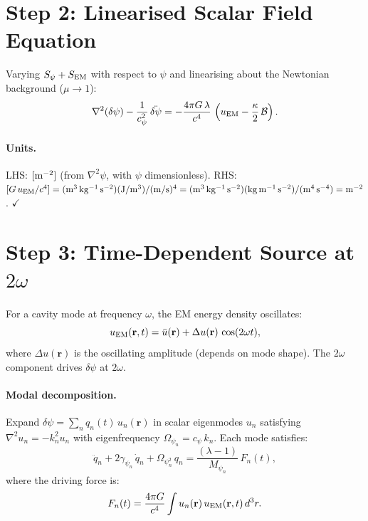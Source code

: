 \documentclass[11pt]{article}
\newcommand{\Opsi}{\Omega_\psi}
\newcommand{\gpsi}{\gamma_\psi}
\newcommand{\Mpsi}{M_\psi}
\newcommand{\calB}{\mathcal{B}}
\theoremstyle{definition}
\theoremstyle{remark}
\begin{document}
\section{Step 2: Linearised Scalar Field Equation}
\label{sec:dim-step2}

Varying $S_\psi + S_{\rm EM}$ with respect to $\psi$ and linearising
about the Newtonian background ($\mu \to 1$):
\begin{equation}
\nabla^2(\delta\psi) - \frac{1}{c_\psi^2}\,\ddot{\delta\psi}
= -\frac{4\pi G\,\lambda}{c^4}\,
\left(u_{\rm EM} - \frac{\kappa}{2}\,\calB\right).
\label{eq:linearised}
\end{equation}

\paragraph{Units.}
LHS: $[{\rm m}^{-2}]$ (from $\nabla^2\psi$, with $\psi$ dimensionless).
RHS: $[G\,u_{\rm EM}/c^4] = ({\rm m^3\,kg^{-1}\,s^{-2}})({\rm J/m^3})
/({\rm m/s})^4 = ({\rm m^3\,kg^{-1}\,s^{-2}})({\rm kg\,m^{-1}\,s^{-2}})
/({\rm m^4\,s^{-4}}) = {\rm m^{-2}}$. $\checkmark$


\section{Step 3: Time-Dependent Source at $2\omega$}
\label{sec:dim-step3}

For a cavity mode at frequency $\omega$, the EM energy density oscillates:
\begin{equation}
u_{\rm EM}(\mathbf{r},t) = \bar{u}(\mathbf{r})
+ \Delta u(\mathbf{r})\,\cos(2\omega t),
\end{equation}
where $\Delta u(\mathbf{r})$ is the oscillating amplitude (depends on
mode shape). The $2\omega$ component drives $\delta\psi$ at $2\omega$.

\paragraph{Modal decomposition.}
Expand $\delta\psi = \sum_n q_n(t)\,u_n(\mathbf{r})$ in scalar
eigenmodes $u_n$ satisfying $\nabla^2 u_n = -k_n^2 u_n$ with
eigenfrequency $\Opsi_n = c_\psi\,k_n$. Each mode satisfies:
\begin{equation}
\ddot{q}_n + 2\gpsi_n\,\dot{q}_n + \Opsi_n^2\,q_n
= \frac{(\lambda - 1)}{\Mpsi_n}\,F_n(t),
\label{eq:mode-eom}
\end{equation}
where the driving force is:
\begin{equation}
F_n(t) = \frac{4\pi G}{c^4}\int u_n(\mathbf{r})\,
u_{\rm EM}(\mathbf{r},t)\,d^3r.
\end{equation}
\end{document}
